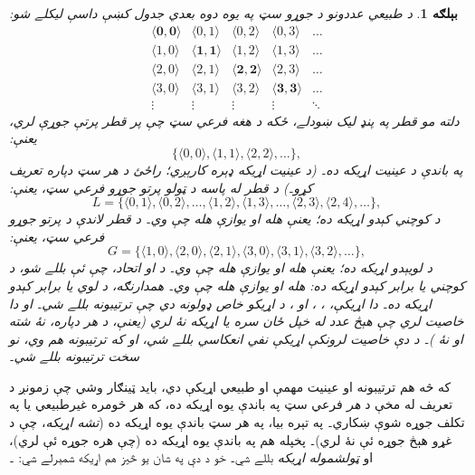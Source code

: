 \documentclass[12pt,a4paper,oneside]{report}
\newcommand{\Setabs}[2]{\{#1 : #2\}}
\newcommand{\Nat}{\mathbb{N}}
\newcommand{\tuple}[1]{\langle #1\rangle}
\newcommand{\Id}[1]{\mathord{\mathrm{Id}_{#1}}}
\newcommand{\ollabel}[1]{\label{\pspart:\pschapter:\pssection:#1}}
\newenvironment{explain}{}{}
\newtheorem{ex}[defn]{بېلګه}
\begin{document}
\begin{ex}
  \ollabel{relations}
د طبيعي عددونو د جوړو سټ \LR{$\Nat^{2}$} په يوه دوه بعدي جدول کښې داسې
ليکلے شو:
\[
  \begin{array}{ccccc}
  \mathbf{\tuple{ 0,0 }} & \tuple{ 0,1 } &
    \tuple{ 0,2 } & \tuple{ 0,3 } & \ldots\\
  \tuple{ 1,0 } & \mathbf{\tuple{ 1,1 }} &
    \tuple{ 1,2 } & \tuple{ 1,3 } & \ldots\\
  \tuple{ 2,0 } & \tuple{ 2,1 } &
    \mathbf{\tuple{ 2,2 }} & \tuple{ 2,3 } & \ldots\\
  \tuple{ 3,0 } & \tuple{ 3,1 } & \tuple{ 3,2 } &
    \mathbf{\tuple{ 3,3 }} & \ldots\\
  \vdots & \vdots & \vdots & \vdots & \mathbf{\ddots}
  \end{array}
\]
دلته مو قطر په پنډ ليک ښودلے، ځکه د \LR{$\Nat^2$} هغه فرعي سټ چې پر
قطر پرتې جوړې لري، يعنې:
\[
  \{\tuple{0,0 }, \tuple{ 1,1 }, \tuple{ 2,2 }, \dots\},
  \]
په \LR{$\Nat$} باندې \emph{د عينيت اړيکه} ده۔ (د عينيت اړيکه ډېره کارېږي؛
راځئ د هر سټ  دپاره
\LR{$\Id{A}=\Setabs{\tuple{ x,x }}{x \in A}$} تعريف کړو۔) د قطر له پاسه
د ټولو پرتو جوړو فرعي سټ، يعنې:
\[
  L = \{\tuple{ 0,1 },\tuple{ 0,2 },\ldots,\tuple{ 1,2 },
  \tuple{ 1,3 }, \dots, \tuple{ 2,3 }, \tuple{ 2,4 },\ldots\},
\]
د \emph{کوچني کېدو} اړيکه ده؛ يعنې  هله او يوازې هله چې
 وي۔ د قطر لاندې د پرتو جوړو فرعي سټ، يعنې:
\[
  G=\{ \tuple{ 1,0 },\tuple{ 2,0 },\tuple{
    2,1 }, \tuple{ 3,0 },\tuple{ 3,1 },\tuple{ 3,2 }, \dots\},
\]
د \emph{لويېدو} اړيکه ده؛ يعنې  هله او يوازې هله چې 
وي۔ د  او  اتحاد، چې  ئې بللے شو، د
\emph{کوچني يا برابر کېدو} اړيکه ده:  هله او يوازې هله چې
 وي۔ همدارنګه،  د \emph{لوي يا برابر کېدو
اړيکه} ده۔ دا اړيکې، ، ،  او ، د اړيکو خاص ډولونه دي
چې \emph{ترتيبونه} بللے شي۔  او  دا خاصيت لري چې هېڅ عدد له
خپل ځان سره  يا  اړيکه نۀ لري (يعنې، د هر  دپاره، نۀ 
شته او نۀ )۔ د دې خاصيت لرونکې اړيکې \emph{نفي انعکاسي}
بللے شي، او که ترتيبونه هم وي، نو \emph{سخت ترتيبونه} بللے شي۔
\end{ex}

\begin{explain}
که څه هم ترتيبونه او عينيت مهمې او طبيعي اړيکې دي، بايد ټينګار وشي
چې زمونږ د تعريف له مخې د  \emph{هر} فرعي سټ په  باندې
يوه اړيکه ده، که هر څومره غيرطبيعي يا په تکلف جوړه شوې ښکاري۔
په تېره بيا، \LR{$\emptyset$} په هر سټ باندې يوه اړيکه ده (\emph{تشه اړيکه}،
چې د غړو هېڅ جوړه ئې نۀ لري)۔ پخپله  هم په  باندې يوه
اړيکه ده (چې هره جوړه ئې لري)، او \emph{ټولشموله اړيکه} بللے شي۔
خو د دې په شان يو څيز هم اړيکه شمېرلے شي:
\LR{$E=\Setabs{\tuple{n, m}}{n>5 \text{\RL{ يا }} m \times n \ge 34}$}۔
\end{explain}
\end{document}

